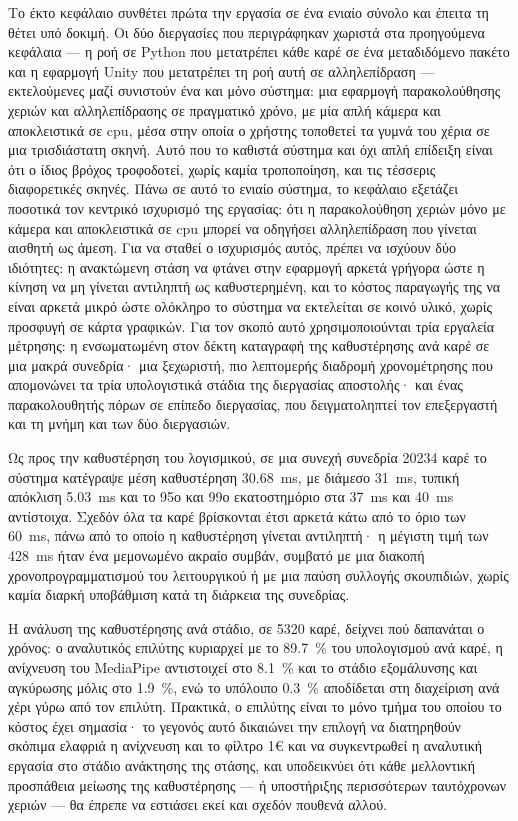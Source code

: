 Το έκτο κεφάλαιο συνθέτει πρώτα την εργασία σε ένα ενιαίο σύνολο και έπειτα
τη θέτει υπό δοκιμή. Οι δύο διεργασίες που περιγράφηκαν χωριστά στα προηγούμενα
κεφάλαια — η ροή σε Python που μετατρέπει κάθε καρέ σε ένα μεταδιδόμενο πακέτο
και η εφαρμογή Unity που μετατρέπει τη ροή αυτή σε αλληλεπίδραση — εκτελούμενες
μαζί συνιστούν ένα και μόνο σύστημα: μια εφαρμογή παρακολούθησης χεριών και
αλληλεπίδρασης σε πραγματικό χρόνο, με μία απλή κάμερα και αποκλειστικά σε \acrshort{cpu},
μέσα στην οποία ο χρήστης τοποθετεί τα γυμνά του χέρια σε μια τρισδιάστατη σκηνή.
Αυτό που το καθιστά σύστημα και όχι απλή επίδειξη είναι ότι ο ίδιος βρόχος
τροφοδοτεί, χωρίς καμία τροποποίηση, και τις τέσσερις διαφορετικές σκηνές. Πάνω σε αυτό
το ενιαίο σύστημα, το κεφάλαιο εξετάζει ποσοτικά τον κεντρικό ισχυρισμό της εργασίας: ότι
η παρακολούθηση χεριών μόνο με κάμερα και αποκλειστικά σε \acrshort{cpu}
μπορεί να οδηγήσει αλληλεπίδραση που γίνεται αισθητή ως άμεση. Για να σταθεί
ο ισχυρισμός αυτός, πρέπει να ισχύουν δύο ιδιότητες: η ανακτώμενη στάση να
φτάνει στην εφαρμογή αρκετά γρήγορα ώστε η κίνηση να μη γίνεται αντιληπτή ως
καθυστερημένη, και το κόστος παραγωγής της να είναι αρκετά μικρό ώστε
ολόκληρο το σύστημα να εκτελείται σε κοινό υλικό, χωρίς προσφυγή σε κάρτα
γραφικών. Για τον σκοπό αυτό χρησιμοποιούνται τρία εργαλεία μέτρησης: η
ενσωματωμένη στον δέκτη καταγραφή της καθυστέρησης ανά καρέ σε μια μακρά
συνεδρία· μια ξεχωριστή, πιο λεπτομερής διαδρομή χρονομέτρησης που απομονώνει
τα τρία υπολογιστικά στάδια της διεργασίας αποστολής· και ένας παρακολουθητής
πόρων σε επίπεδο διεργασίας, που δειγματοληπτεί τον επεξεργαστή και τη μνήμη
και των δύο διεργασιών.

Ως προς την καθυστέρηση του λογισμικού, σε μια συνεχή συνεδρία \num{20234}
καρέ το σύστημα κατέγραψε μέση καθυστέρηση \SI{30.68}{\ms}, με διάμεσο
\SI{31}{\ms}, τυπική απόκλιση \SI{5.03}{\ms} και το 95ο και 99ο
εκατοστημόριο στα \SI{37}{\ms} και \SI{40}{\ms} αντίστοιχα. Σχεδόν όλα τα
καρέ βρίσκονται έτσι αρκετά κάτω από το όριο των \SI{60}{\ms}, πάνω από το
οποίο η καθυστέρηση γίνεται αντιληπτή· η μέγιστη τιμή των \SI{428}{\ms} ήταν
ένα μεμονωμένο ακραίο συμβάν, συμβατό με μια διακοπή χρονοπρογραμματισμού του
λειτουργικού ή με μια παύση συλλογής σκουπιδιών, χωρίς καμία διαρκή
υποβάθμιση κατά τη διάρκεια της συνεδρίας.

Η ανάλυση της καθυστέρησης ανά στάδιο, σε \num{5320} καρέ, δείχνει πού
δαπανάται ο χρόνος: ο αναλυτικός επιλύτης κυριαρχεί με το \SI{89.7}{\percent}
του υπολογισμού ανά καρέ, η ανίχνευση του MediaPipe αντιστοιχεί στο
\SI{8.1}{\percent} και το στάδιο εξομάλυνσης και αγκύρωσης μόλις στο
\SI{1.9}{\percent}, ενώ το υπόλοιπο \SI{0.3}{\percent} αποδίδεται στη
διαχείριση ανά χέρι γύρω από τον επιλύτη. Πρακτικά, ο επιλύτης είναι το μόνο
τμήμα του οποίου το κόστος έχει σημασία· το γεγονός αυτό δικαιώνει την επιλογή
να διατηρηθούν σκόπιμα ελαφριά η ανίχνευση και το φίλτρο 1\euro{} και να
συγκεντρωθεί η αναλυτική εργασία στο στάδιο ανάκτησης της στάσης, και
υποδεικνύει ότι κάθε μελλοντική προσπάθεια μείωσης της καθυστέρησης --- ή
υποστήριξης περισσότερων ταυτόχρονων χεριών --- θα έπρεπε να εστιάσει εκεί
και σχεδόν πουθενά αλλού.

